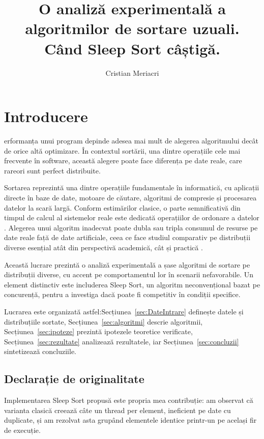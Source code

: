 \documentclass[9pt,a4paper,twocolumn,twoside]{rho-class/rho}
\title{O analiză experimentală a algoritmilor de sortare uzuali. Când Sleep Sort câștigă.}
\author[{\textasteriskcentered},a,1]{Cristian Meriacri}
\affil[a]{Universitatea de Vest din Timișoara, Facultatea de Informatică, Str. Pârvan 4, Timișoara 300223, România - cristian.meriacri00@e-uvt.ro}
\begin{document}
    \maketitle
    \thispagestyle{firststyle}

\tableofcontents
\newpage
\section{Introducere}

erformanța unui program depinde adesea mai mult de alegerea 
algoritmului decât de orice altă optimizare. În contextul sortării, una 
dintre operațiile cele mai frecvente în software, această alegere poate 
face diferența pe date reale, care rareori sunt perfect distribuite.

Sortarea reprezintă una dintre operațiile fundamentale în informatică,
cu aplicații directe în baze de date, motoare de căutare, algoritmi de 
compresie și procesarea datelor la scară largă. Conform estimărilor 
clasice, o parte semnificativă din timpul de calcul al sistemelor reale 
este dedicată operațiilor de ordonare a datelor \cite{knuth1998sorting}.
Alegerea unui algoritm inadecvat poate dubla sau tripla consumul de 
resurse pe date reale față de date artificiale, ceea ce face studiul 
comparativ pe distribuții diverse esențial atât din perspectivă 
academică, cât și practică \cite{bentley1993engineering}.

Această lucrare prezintă o analiză experimentală a șase algoritmi de 
sortare pe distribuții diverse, cu accent pe comportamentul lor în scenarii 
nefavorabile. Un element distinctiv este includerea Sleep Sort, un algoritm 
neconvențional bazat pe concurență, pentru a investiga dacă poate fi 
competitiv în condiții specifice.


Lucrarea este organizată astfel:Secțiunea~\ref{sec:DateIntrare} definește datele și distribuțiile sortate, Secțiunea~\ref{sec:algoritmi} descrie 
algoritmii, Secțiunea~\ref{sec:ipoteze} prezintă ipotezele teoretice verificate, Secțiunea~\ref{sec:rezultate} analizează rezultatele, 
iar Secțiunea~\ref{sec:concluzii} sintetizează concluziile.


\subsection{Declarație de originalitate}
Implementarea Sleep Sort propusă este propria mea contribuție: am observat 
că varianta clasică creează câte un thread per element, ineficient pe date 
cu duplicate, și am rezolvat asta grupând elementele identice printr-un 
 pe același fir de execuție.
\end{document}
